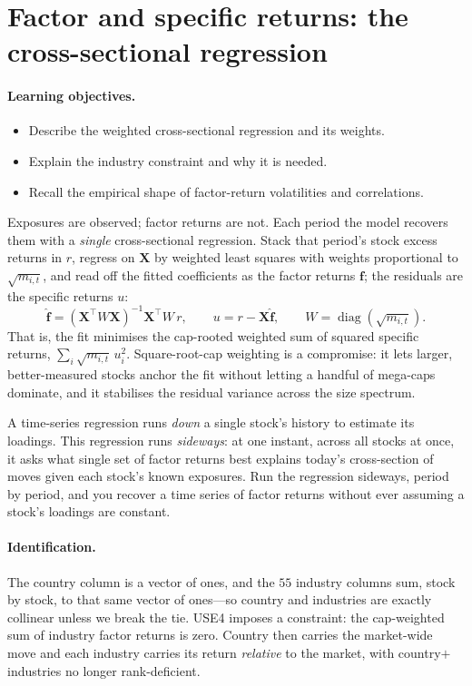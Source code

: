 \documentclass[11pt]{article}
\theoremstyle{definition}
\theoremstyle{plain}
\theoremstyle{remark}
\DeclareMathOperator{\diag}{diag}
\newcommand{\T}{^{\!\top}}
\newcommand{\Xmat}{\mathbf{X}}
\newcommand{\fvec}{\mathbf{f}}
\begin{document}
\section{Factor and specific returns: the cross-sectional regression}\label{sec:csr}

\paragraph{Learning objectives.}
\begin{itemize}[leftmargin=1.4em,nosep]
  \item Describe the weighted cross-sectional regression and its weights.
  \item Explain the industry constraint and why it is needed.
  \item Recall the empirical shape of factor-return volatilities and correlations.
\end{itemize}

Exposures are observed; factor returns are not. Each period the model recovers them with a \emph{single} cross-sectional regression. Stack that period's stock excess returns in $r$, regress on $\Xmat$ by weighted least squares with weights proportional to $\sqrt{m_{i,t}}$, and read off the fitted coefficients as the factor returns $\fvec$; the residuals are the specific returns $u$:
\[
  \hat{\fvec} = (\Xmat\T W \Xmat)^{-1}\Xmat\T W\, r, \qquad u = r - \Xmat\hat{\fvec}, \qquad W = \diag(\sqrt{m_{i,t}}).
\]
That is, the fit minimises the cap-rooted weighted sum of squared specific returns, $\sum_i \sqrt{m_{i,t}}\, u_i^2$. Square-root-cap weighting is a compromise: it lets larger, better-measured stocks anchor the fit without letting a handful of mega-caps dominate, and it stabilises the residual variance across the size spectrum.

\begin{intuition}
A time-series regression runs \emph{down} a single stock's history to estimate its loadings. This regression runs \emph{sideways}: at one instant, across all stocks at once, it asks what single set of factor returns best explains today's cross-section of moves given each stock's known exposures. Run the regression sideways, period by period, and you recover a time series of factor returns without ever assuming a stock's loadings are constant.
\end{intuition}

\paragraph{Identification.} The country column is a vector of ones, and the $55$ industry columns sum, stock by stock, to that same vector of ones---so country and industries are exactly collinear unless we break the tie. USE4 imposes a constraint: the cap-weighted sum of industry factor returns is zero. Country then carries the market-wide move and each industry carries its return \emph{relative} to the market, with country$+$industries no longer rank-deficient.
\end{document}
